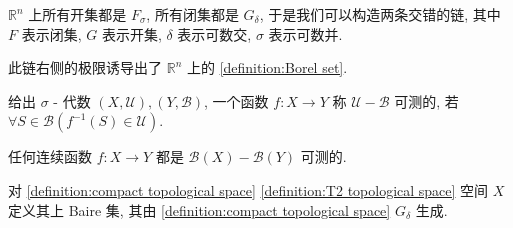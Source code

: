 \begin{remark}
    \(\mathbb{R}^n\) 上所有开集都是 \(F_\sigma\), 所有闭集都是 \(G_\delta\), 于是我们可以构造两条交错的链,
    其中 \(F\) 表示闭集, \(G\) 表示开集, \(\delta\) 表示可数交, \(\sigma\) 表示可数并.

    \begin{center}
    \end{center}

    此链右侧的极限诱导出了 \(\mathbb{R}^n\) 上的 \ref{definition:Borel set}.
\end{remark}

\begin{definition}[可测函数]
    \label {definition:measurable function}
    给出 \(\sigma\) - 代数 \((X,\mathcal{U}),(Y,\mathcal{B})\), 一个函数 \(f:X \to Y\) 称 \(\mathcal{U} - \mathcal{B}\) 可测的,
    若 \(\forall S \in \mathcal{B}(f^{-1}(S) \in \mathcal{U})\).
\end{definition}

\begin{corollary}
    任何连续函数 \(f:X \to Y\) 都是 \(\mathcal{B}(X) - \mathcal{B}(Y)\) 可测的.
\end{corollary}

\begin{definition}[Baire 集]
    \label {definition:Baire sets}
    对 \ref{definition:compact topological space} \ref{definition:T2 topological space} 空间 \(X\) 定义其上 Baire 集,
    其由 \ref{definition:compact topological space} \(G_\delta\) 生成.
\end{definition}


